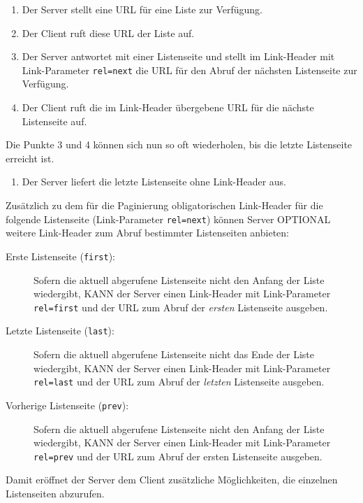 \documentclass[,a4paper]{article}
\begin{document}
\begin{enumerate}
\def\labelenumi{\arabic{enumi}.}
\item
  Der Server stellt eine URL für eine Liste zur Verfügung.
\item
  Der Client ruft diese URL der Liste auf.
\item
  Der Server antwortet mit einer Listenseite und stellt im Link-Header
  mit Link-Parameter \texttt{rel=next} die URL für den Abruf der
  nächsten Listenseite zur Verfügung.
\item
  Der Client ruft die im Link-Header übergebene URL für die nächste
  Listenseite auf.
\end{enumerate}

Die Punkte 3 und 4 können sich nun so oft wiederholen, bis die letzte
Listenseite erreicht ist.

\begin{enumerate}
\def\labelenumi{\arabic{enumi}.}
\setcounter{enumi}{4}
\itemsep1pt\parskip0pt
\item
  Der Server liefert die letzte Listenseite ohne Link-Header aus.
\end{enumerate}

Zusätzlich zu dem für die Paginierung obligatorischen Link-Header für
die folgende Listenseite (Link-Parameter \texttt{rel=next}) können
Server OPTIONAL weitere Link-Header zum Abruf bestimmter Listenseiten
anbieten:

\begin{description}
\item[Erste Listenseite (\texttt{first}):]
Sofern die aktuell abgerufene Listenseite nicht den Anfang der Liste
wiedergibt, KANN der Server einen Link-Header mit Link-Parameter
\texttt{rel=first} und der URL zum Abruf der \emph{ersten} Listenseite
ausgeben.
\item[Letzte Listenseite (\texttt{last}):]
Sofern die aktuell abgerufene Listenseite nicht das Ende der Liste
wiedergibt, KANN der Server einen Link-Header mit Link-Parameter
\texttt{rel=last} und der URL zum Abruf der \emph{letzten} Listenseite
ausgeben.
\item[Vorherige Listenseite (\texttt{prev}):]
Sofern die aktuell abgerufene Listenseite nicht den Anfang der Liste
wiedergibt, KANN der Server einen Link-Header mit Link-Parameter
\texttt{rel=prev} und der URL zum Abruf der ersten Listenseite ausgeben.
\end{description}

Damit eröffnet der Server dem Client zusätzliche Möglichkeiten, die
einzelnen Listenseiten abzurufen.
\end{document}
